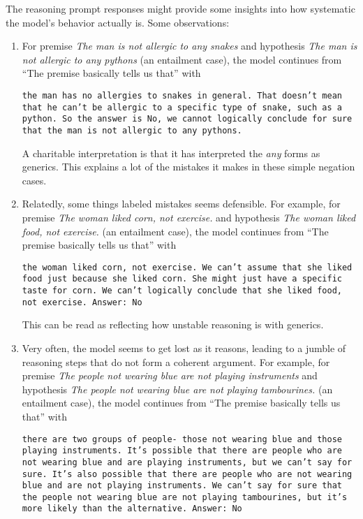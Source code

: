 \documentclass[11pt]{article}
\newcommand{\mynewline}{{\color{gray}{\textbackslash n\\}}}
\newcommand{\word}[1]{\emph{#1}}
\begin{document}
The reasoning prompt responses might provide some insights into how
systematic the model's behavior actually is. Some observations:
%
\begin{enumerate}
\item For premise \word{The man is not allergic to any snakes} and
  hypothesis \word{The man is not allergic to any pythons} (an
  entailment
  case), the model continues from ``The premise basically tells us
  that'' with

  \texttt{the man has no allergies to snakes in general. That doesn't
    mean that he can't be allergic to a specific type of snake, such
    as a python. So the answer is No, we cannot logically conclude for
    sure that the man is not allergic to any pythons.}

  A charitable interpretation is that it has interpreted the \word{any}
  forms as generics. This explains a lot of the mistakes it makes
  in these simple negation cases.

\item Relatedly, some things labeled mistakes seems defensible. For
  example, for
  premise  \word{The woman liked corn, not exercise.} and hypothesis
  \word{The woman liked food, not exercise.} (an entailment case), the
  model continues from ``The premise basically tells us that'' with

  \texttt{the woman liked corn, not exercise. We can't assume that she
    liked food just because she liked corn. She might just have a
    specific taste for corn. We can't logically conclude that she
    liked food, not exercise.\mynewline
    Answer: No}

  This can be read as reflecting how unstable reasoning is with
  generics.

\item Very often, the model seems to get lost as it reasons,
  leading to a jumble of reasoning steps that do not form a coherent
  argument. For example, for premise \word{The people not wearing blue
    are not playing instruments}
  and hypothesis \word{The people not wearing blue are not playing
    tambourines.} (an entailment case), the model continues from ``The
  premise basically tells us that'' with

  \texttt{there are two groups of people- those not wearing blue and those
  playing instruments. It's possible that there are people who are not
  wearing blue and are playing instruments, but we can't say for sure.
  It's also possible that there are people who are not wearing blue
  and are not playing instruments. We can't say for sure that the
  people not wearing blue are not playing tambourines, but it's more
  likely than the alternative.\mynewline
  Answer: No}


\end{enumerate}
\end{document}
